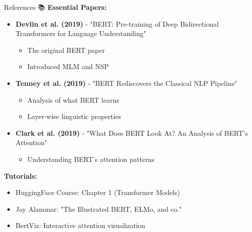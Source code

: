 \documentclass[aspectratio=169]{beamer}
\begin{document}
\begin{frame}[shrink=10]{References 📚}
\textbf{Essential Papers:}

\vspace{0.5em}

\begin{itemize}\setlength{\itemsep}{0pt}
    \item \textbf{Devlin et al. (2019)} - "BERT: Pre-training of Deep Bidirectional Transformers for Language Understanding"
    \begin{itemize}\setlength{\itemsep}{0pt}
        \item The original BERT paper
        \item Introduced MLM and NSP
    \end{itemize}

    \vspace{0.3em}

    \item \textbf{Tenney et al. (2019)} - "BERT Rediscovers the Classical NLP Pipeline"
    \begin{itemize}\setlength{\itemsep}{0pt}
        \item Analysis of what BERT learns
        \item Layer-wise linguistic properties
    \end{itemize}

    \vspace{0.3em}

    \item \textbf{Clark et al. (2019)} - "What Does BERT Look At? An Analysis of BERT's Attention"
    \begin{itemize}\setlength{\itemsep}{0pt}
        \item Understanding BERT's attention patterns
    \end{itemize}
\end{itemize}

\vspace{0.5em}

\textbf{Tutorials:}
\begin{itemize}\setlength{\itemsep}{0pt}
    \item HuggingFace Course: Chapter 1 (Transformer Models)
    \item Jay Alammar: "The Illustrated BERT, ELMo, and co."
    \item BertViz: Interactive attention visualization
\end{itemize}
\end{frame}
\end{document}
